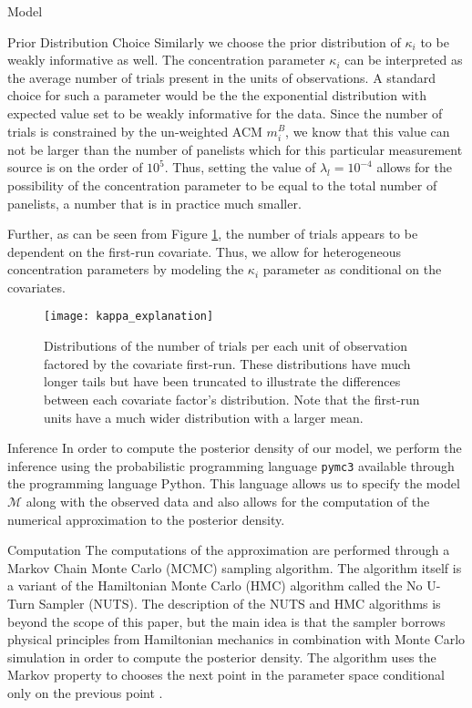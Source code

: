 \begin{chapter}{Model}
\begin{section}{Prior Distribution Choice}
  Similarly we choose the prior distribution of $\kappa_i$ to be weakly informative as well.
  The concentration parameter $\kappa_i$ can be interpreted as the average number of trials present
  in the units of observations.
  A standard choice for such a parameter would be the the exponential distribution with expected value set
  to be weakly informative for the data. Since the number of trials is constrained by the un-weighted ACM $m_i^B$,
  we know that this value can not be larger than the number of panelists which for this
  particular measurement source is on the order of $10^{5}$. Thus, setting the value of $\lambda_l = 10^{-4}$ allows for the possibility
  of the concentration parameter to be equal to the total number of panelists, a number that is in practice much smaller.

  Further, as can be seen from Figure \ref{fig:kappa:explanation}, the number of trials
  appears to be dependent on the first-run covariate. Thus, we allow for heterogeneous concentration
  parameters by modeling the $\kappa_i$ parameter as conditional on the covariates.

  \begin{figure}[h!]
    \begin{center}
      \texttt{[image: kappa\_explanation]}
    \end{center}
    \caption{Distributions of the number of trials per each unit of observation factored
      by the covariate first-run.
      These distributions have much longer tails but have been truncated to illustrate the
      differences between each covariate factor's distribution. Note that the first-run units have a much wider distribution with
      a larger mean.
    }\label{fig:kappa:explanation}
  \end{figure}

\end{section}

\begin{section}{Inference}
  In order to compute the posterior density of our model, we perform the
  inference using the probabilistic programming language \texttt{pymc3} available through the programming language Python.
  This language
  allows us to specify the model $\mathcal{M}$ along with the observed data
  and also allows for the computation of the numerical approximation to the posterior density.

  \begin{subsection}{Computation}
    The computations of the approximation are performed through a Markov Chain Monte Carlo (MCMC) sampling algorithm.
    The algorithm itself is a variant of the Hamiltonian Monte Carlo (HMC) algorithm
    called the No U-Turn Sampler (NUTS). The description of the NUTS and HMC algorithms is beyond the scope of this
    paper, but the main idea is that the sampler borrows physical principles
    from Hamiltonian mechanics in combination with Monte Carlo simulation in order to compute the posterior density.
    The algorithm uses the Markov property to chooses the next point in the parameter space conditional
    only on the previous point \cite{pymc3}.


\end{subsection}
\end{section}
\end{chapter}
